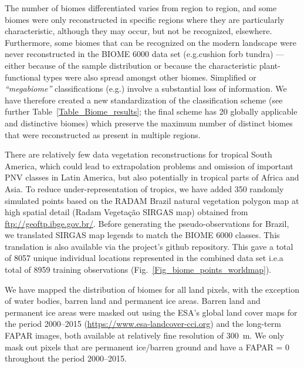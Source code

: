 \documentclass[fleqn,10pt,lineno]{wlpeerj} %
\begin{document}
The number of biomes differentiated varies from region to region, and some biomes were only reconstructed in specific regions where they are particularly characteristic, although they may occur, but not be recognized, elsewhere. Furthermore, some biomes that can be recognized on the modern landscape were never reconstructed in the BIOME 6000 data set (e.g.\@ cushion forb tundra) --- either because of the sample distribution or because the characteristic plant-functional types were also spread amongst other biomes. Simplified or \emph{``megabiome''} classifications (e.g.\@ \citet{Harrison2012403}) involve a substantial loss of information. We have therefore created a new standardization of the classification scheme (see further Table~\ref{Table_Biome_results}; the final scheme has 20 globally applicable and distinctive biomes) which preserve the maximum number of distinct biomes that were reconstructed as present in multiple regions.\par

There are relatively few data vegetation reconstructions for tropical South America, which could lead to extrapolation problems and omission of important PNV classes in Latin America, but also potentially in tropical parts of Africa and Asia. To reduce under-representation of tropics, we have added 350 randomly simulated points based on the RADAM Brazil natural vegetation polygon map at high spatial detail (Radam Vegeta{\c{c}}{\~a}o SIRGAS map) \citep{veloso1992manual} obtained from \url{ftp://geoftp.ibge.gov.br/}. Before generating the pseudo-observations for Brazil, we translated SIRGAS map legends to match the BIOME 6000 classes. This translation is also available via the project's github repository. This gave a total of 8057 unique individual locations represented in the combined data set i.e.\@ a total of 8959 training observations (Fig.\@~\ref{Fig_biome_points_worldmap}).\par

We have mapped the distribution of biomes for all land pixels, with the exception of water bodies, barren land and permanent ice areas. Barren land and permanent ice areas were masked out using the ESA's global land cover maps for the period 2000--2015 (\url{https://www.esa-landcover-cci.org}) and the long-term FAPAR images, both available at relatively fine resolution of \SI{300}{\meter}. We only mask out pixels that are permanent ice/barren ground and have a FAPAR = 0 throughout the period 2000--2015.\par
\end{document}
